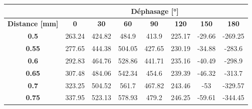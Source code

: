 \begin{table}[H]
    \centering
    \begin{tabular}{|c|ccccccc|}
    \hline
    \textbf{}                  & \multicolumn{7}{c|}{\textbf{Déphasage {[}°{]}}}                                                                                                                                                                                 \\ \hline
    \textbf{Distance {[}mm{]}} & \multicolumn{1}{c|}{\textbf{0}} & \multicolumn{1}{c|}{\textbf{30}} & \multicolumn{1}{c|}{\textbf{60}} & \multicolumn{1}{c|}{\textbf{90}} & \multicolumn{1}{c|}{\textbf{120}} & \multicolumn{1}{c|}{\textbf{150}} & \textbf{180} \\ \hline
    \textbf{0.5}               & \multicolumn{1}{c|}{263.24}     & \multicolumn{1}{c|}{424.82}      & \multicolumn{1}{c|}{484.9}       & \multicolumn{1}{c|}{413.9}       & \multicolumn{1}{c|}{225.17}       & \multicolumn{1}{c|}{-29.66}       & -269.25      \\ \hline
    \textbf{0.55}              & \multicolumn{1}{c|}{277.65}     & \multicolumn{1}{c|}{444.38}      & \multicolumn{1}{c|}{504.05}      & \multicolumn{1}{c|}{427.65}      & \multicolumn{1}{c|}{230.19}       & \multicolumn{1}{c|}{-34.88}       & -283.6       \\ \hline
    \textbf{0.6}               & \multicolumn{1}{c|}{292.83}     & \multicolumn{1}{c|}{464.76}      & \multicolumn{1}{c|}{528.86}      & \multicolumn{1}{c|}{441.71}      & \multicolumn{1}{c|}{235.16}       & \multicolumn{1}{c|}{-40.49}       & -298.9       \\ \hline
    \textbf{0.65}              & \multicolumn{1}{c|}{307.48}     & \multicolumn{1}{c|}{484.06}      & \multicolumn{1}{c|}{542.34}      & \multicolumn{1}{c|}{454.6}       & \multicolumn{1}{c|}{239.39}       & \multicolumn{1}{c|}{-46.32}       & -313.7       \\ \hline
    \textbf{0.7}               & \multicolumn{1}{c|}{323.25}     & \multicolumn{1}{c|}{504.52}      & \multicolumn{1}{c|}{561.7}       & \multicolumn{1}{c|}{467.82}      & \multicolumn{1}{c|}{243.46}       & \multicolumn{1}{c|}{-53}          & -329.57      \\ \hline
    \textbf{0.75}              & \multicolumn{1}{c|}{337.95}     & \multicolumn{1}{c|}{523.13}      & \multicolumn{1}{c|}{578.93}      & \multicolumn{1}{c|}{479.2}       & \multicolumn{1}{c|}{246.25}       & \multicolumn{1}{c|}{-59.61}       & -344.45      \\ \hline

\end{tabular}
\end{table}
